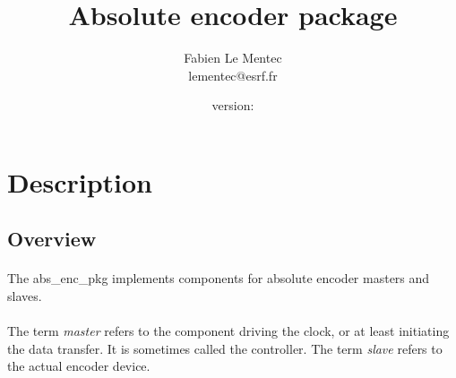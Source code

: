 \documentclass[12pt]{article}
\begin{document}

\newcommand{\todo}[1]
{\paragraph{}\textbf{TODO}: #1}

{\lstset{language=VHDL, basicstyle=\tiny, frame=single}}{}

{\lstset{frame=single}}{}

\newcommand{\longurl}[2]
{\url{#1#2}}

\newcommand{\longlongurl}[3]
{\url{#1#2#3}}

{}{\newcommand{\version}{none}}





\title{Absolute encoder package}
\author{Fabien Le Mentec \\ lementec@esrf.fr}
\date{\small{version: \version}}
\maketitle


\newpage
\setcounter{tocdepth}{1}
\tableofcontents


\newpage
\section{Description}

\subsection{Overview}
\paragraph{}
The abs\_enc\_pkg implements components for absolute encoder masters and
slaves.

\paragraph{}
The term \textit{master} refers to the component driving the clock, or at
least initiating the data transfer. It is sometimes called the controller.
The term \textit{slave} refers to the actual encoder device.
\end{document}
